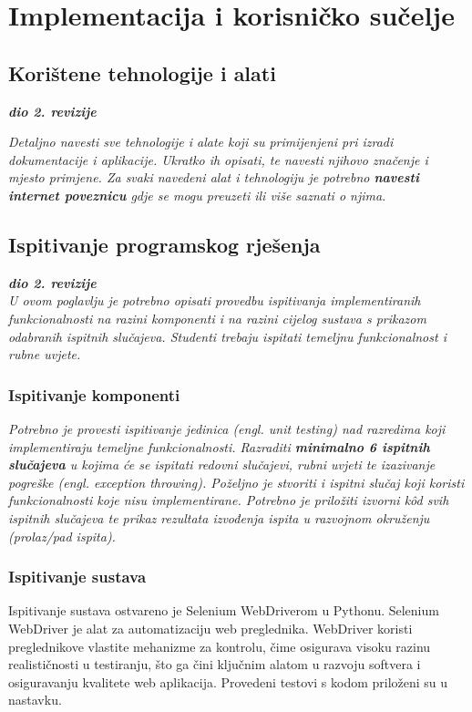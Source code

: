 \chapter{Implementacija i korisničko sučelje}
		
		
		\section{Korištene tehnologije i alati}
		
			\textbf{\textit{dio 2. revizije}}
			
			 \textit{Detaljno navesti sve tehnologije i alate koji su primijenjeni pri izradi dokumentacije i aplikacije. Ukratko ih opisati, te navesti njihovo značenje i mjesto primjene. Za svaki navedeni alat i tehnologiju je potrebno \textbf{navesti internet poveznicu} gdje se mogu preuzeti ili više saznati o njima}.
			
			
			\eject 
		
	
		\section{Ispitivanje programskog rješenja}
			
			\textbf{\textit{dio 2. revizije}}\\
			
			 \textit{U ovom poglavlju je potrebno opisati provedbu ispitivanja implementiranih funkcionalnosti na razini komponenti i na razini cijelog sustava s prikazom odabranih ispitnih slučajeva. Studenti trebaju ispitati temeljnu funkcionalnost i rubne uvjete.}
	
			
			\subsection{Ispitivanje komponenti}
			\textit{Potrebno je provesti ispitivanje jedinica (engl. unit testing) nad razredima koji implementiraju temeljne funkcionalnosti. Razraditi \textbf{minimalno 6 ispitnih slučajeva} u kojima će se ispitati redovni slučajevi, rubni uvjeti te izazivanje pogreške (engl. exception throwing). Poželjno je stvoriti i ispitni slučaj koji koristi funkcionalnosti koje nisu implementirane. Potrebno je priložiti izvorni kôd svih ispitnih slučajeva te prikaz rezultata izvođenja ispita u razvojnom okruženju (prolaz/pad ispita). }
			
			 

			\subsection{Ispitivanje sustava}
Ispitivanje sustava ostvareno je Selenium WebDriverom u Pythonu. Selenium WebDriver je alat za automatizaciju web preglednika. WebDriver koristi preglednikove vlastite mehanizme za kontrolu, čime osigurava visoku razinu realističnosti u testiranju, što ga čini ključnim alatom u razvoju softvera i osiguravanju kvalitete web aplikacija. Provedeni testovi s kodom priloženi su u nastavku.
\break

